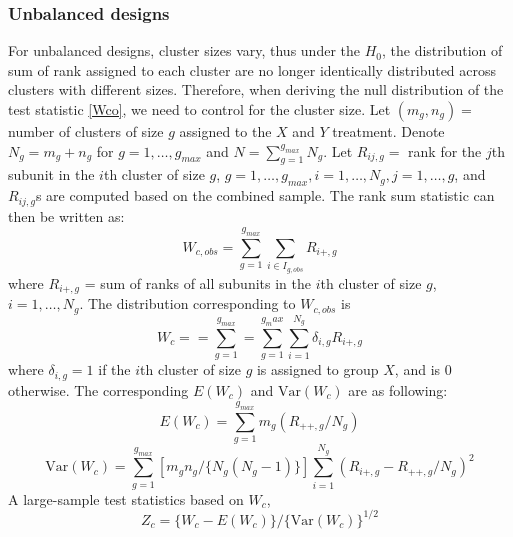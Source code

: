\documentclass[article]{jss}
\begin{document}
\subsubsection{Unbalanced designs}\label{unbal}
For unbalanced designs, cluster sizes vary, 
thus under the $H_0$, 
the distribution of sum of rank
assigned to each cluster are no longer
identically distributed across clusters 
with different sizes. Therefore, when 
deriving the null distribution of the test
statistic \eqref{Wco}, we need to control
for the cluster size. 
Let $(m_g, n_g)=$ number of clusters of
size $g$ assigned to the $X$ and $Y$ treatment.
Denote $N_g = m_g + n_g$ for $g=1,\ldots,g_{max}$
and $N =\sum_{g=1}^{g_{max}}N_g$. 
Let $R_{ij,g} = $ rank for the $j$th
subunit in the $i$th cluster of size $g$,
$g = 1, \ldots, g_{max},
i = 1, \ldots, N_g, j = 1, \ldots, g$, 
and $R_{ij,g}$s are computed based on the
combined sample. 
The rank sum statistic can then be
written as:
\begin{equation}
W_{c, obs} = \sum_{g=1}^{g_{max}}
\sum_{i\in I_{g, obs}}R_{i+, g}
\end{equation}
where $R_{i+,g}$ = sum of ranks of 
all subunits in the $i$th cluster of size $g$,
$i = 1, \ldots, N_g$.
The distribution corresponding to $W_{c, obs}$
is
\begin{equation}
W_c = = \sum_{g = 1}^{g_{max}}
 = \sum_{g = 1}^{g_max}\sum_{i = 1}^{N_g}\delta_{i, g}R_{i+, g}
\end{equation}
where $\delta_{i, g} = 1$ if the $i$th
cluster of size $g$ is assigned to group $X$, and is $0$
otherwise.
The corresponding $E(W_c)$ and $\text{Var}(W_c)$ are 
as following: 
\begin{equation}\label{eq:uEWc}
E(W_c) = \sum_{g=1}^{g_{max}}m_g(R_{++,g}/N_g)
\end{equation}
\begin{equation}\label{eq:uVWc}
\text{Var}(W_c) = \sum_{g=1}^{g_{max}}[m_gn_g/\{N_g(N_g - 1)\}]\sum_{i=1}^{N_g}(R_{i+,g} - R_{++,g}/N_g)^2
\end{equation}
A large-sample test statistics based on $W_c$,%
\begin{equation}
Z_c = \{W_c - E(W_c)\}/\{\text{Var}(W_c)\}^{1/2}
\end{equation}
\end{document}
